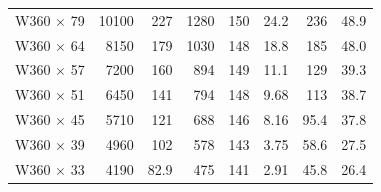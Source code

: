\documentclass[a4paper,openany,12pt]{book}
\begin{document}
{{\begin{center}
\begin{tabular}{lrrrrrrr}
W360 \(\times\) 79 & 10100 & 227 & 1280 & 150 & 24.2 & 236 & 48.9\\
W360 \(\times\) 64 & 8150 & 179 & 1030 & 148 & 18.8 & 185 & 48.0\\
W360 \(\times\) 57 & 7200 & 160 & 894 & 149 & 11.1 & 129 & 39.3\\
W360 \(\times\) 51 & 6450 & 141 & 794 & 148 & 9.68 & 113 & 38.7\\
W360 \(\times\) 45 & 5710 & 121 & 688 & 146 & 8.16 & 95.4 & 37.8\\
W360 \(\times\) 39 & 4960 & 102 & 578 & 143 & 3.75 & 58.6 & 27.5\\
W360 \(\times\) 33 & 4190 & 82.9 & 475 & 141 & 2.91 & 45.8 & 26.4\\
\bottomrule
\end{tabular}
\end{center}

}}
\end{document}
